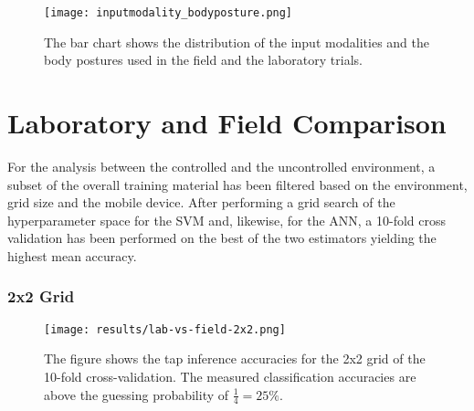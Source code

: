 \begin{figure}
  \centering
  \texttt{[image: inputmodality\_bodyposture.png]}
  \caption{The bar chart shows the distribution of the input modalities and the body postures used in the field and the laboratory trials.}\label{fig:bpimdis}
\end{figure}



\section{Laboratory and Field Comparison}
For the analysis between the controlled and the uncontrolled environment, a subset of the overall training material has been filtered based on the environment, grid size and the mobile device. After performing a grid search of the hyperparameter space for the SVM and, likewise, for the ANN, a 10-fold cross validation has been performed on the best of the two estimators yielding the highest mean accuracy.

\subsubsection{2x2 Grid}

\begin{figure}[h!]
  \centering
  \texttt{[image: results/lab-vs-field-2x2.png]}
  \caption{The figure shows the tap inference accuracies for the 2x2 grid of the 10-fold cross-validation. The measured classification accuracies are above the guessing probability of $\frac{1}{4} = 25\%$.} \label{fig:lab2x2}
\end{figure}

